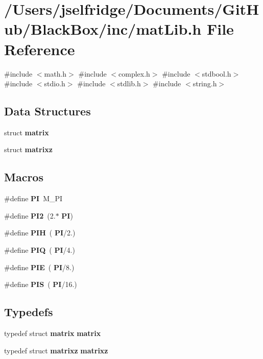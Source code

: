 \section{/\+Users/jselfridge/\+Documents/\+Git\+Hub/\+Black\+Box/inc/mat\+Lib.h File Reference}
\label{mat_lib_8h}
{\ttfamily \#include $<$math.\+h$>$}\newline
{\ttfamily \#include $<$complex.\+h$>$}\newline
{\ttfamily \#include $<$stdbool.\+h$>$}\newline
{\ttfamily \#include $<$stdio.\+h$>$}\newline
{\ttfamily \#include $<$stdlib.\+h$>$}\newline
{\ttfamily \#include $<$string.\+h$>$}\newline
\subsection*{Data Structures}
\begin{DoxyCompactItemize}
\item 
struct \textbf{ matrix}
\item 
struct \textbf{ matrixz}
\end{DoxyCompactItemize}
\subsection*{Macros}
\begin{DoxyCompactItemize}
\item 
\#define \textbf{ PI}~M\+\_\+\+PI
\item 
\#define \textbf{ P\+I2}~(2.$\ast$\textbf{ PI})
\item 
\#define \textbf{ P\+IH}~(\textbf{ PI}/2.)
\item 
\#define \textbf{ P\+IQ}~(\textbf{ PI}/4.)
\item 
\#define \textbf{ P\+IE}~(\textbf{ PI}/8.)
\item 
\#define \textbf{ P\+IS}~(\textbf{ PI}/16.)
\end{DoxyCompactItemize}
\subsection*{Typedefs}
\begin{DoxyCompactItemize}
\item 
typedef struct \textbf{ matrix} \textbf{ matrix}
\item 
typedef struct \textbf{ matrixz} \textbf{ matrixz}
\end{DoxyCompactItemize}

